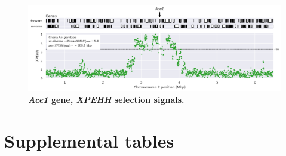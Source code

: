 \documentclass[a4paper,11pt,abstracton,hidelinks]{scrartcl}
\begin{document}
\begin{figure}[t!]
	\begin{center}
		\includegraphics*[width=1\linewidth,center]{artwork/locus_ace1_xpehh_pdist.png}
	\end{center}
	\caption[\textit{Ace1} gene, \textit{XPEHH} selection signals]{
	\textbf{\textit{Ace1} gene, \textit{XPEHH} selection signals.}
	} 
	\label{fig:locus_ace1_xpehh}
\end{figure}


%
%


\clearpage

\section{Supplemental tables}


\clearpage


\begin{table}
\centering
\begin{threeparttable}

\caption[$H12$ selection signals at known insecticide-resistance genes]{
%
\textbf{$H12$ selection signals at known insecticide-resistance genes.}
%
Values shown are peak value of $H12$ found in proximity to the gene.
%
Missing value (\texttt{-}) indicates no peak found in proximity to the gene.
%
}

\label{tbl:locus_peaks_h12}




\end{threeparttable}
\end{table}
\end{document}
